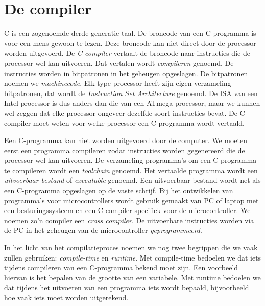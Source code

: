 \section{De compiler}
C is een zogenoemde derde-generatie-taal. De broncode van een C-programma is voor een mens gewoon te lezen. Deze broncode kan niet direct door de processor worden uitgevoerd. De \textsl{C-compiler} vertaalt de broncode naar instructies die de processor wel kan uitvoeren. Dat vertalen wordt \textsl{compileren} genoemd. De instructies worden in bitpatronen in het geheugen opgeslagen. De bitpatronen noemen we \textsl{machinecode}. Elk type processor heeft zijn eigen verzameling bitpatronen, dat wordt de \textsl{Instruction Set Architecture} genoemd. De ISA van een Intel-processor is dus anders dan die van een ATmega-processor, maar we kunnen wel zeggen dat elke processor ongeveer dezelfde soort instructies bevat. De C-compiler moet weten voor welke processor een C-programma wordt vertaald.

Een C-programma kan niet worden uitgevoerd door de computer. We moeten eerst een programma compileren zodat instructies worden gegenereerd die de processor wel kan uitvoeren. De verzameling programma's om een C-programma te compileren wordt een \textsl{toolchain} genoemd. Het vertaalde programma wordt een \textsl{uitvoerbaar bestand} of \textsl{executable} genoemd. Een uitvoerbaar bestand wordt net als een C-programma opgeslagen op de vaste schrijf. Bij het ontwikkelen van programma's voor microcontrollers wordt gebruik gemaakt van PC of laptop met een besturingssysteem en een C-compiler specifiek voor de microcontroller. We noemen zo'n compiler een \textsl{cross compiler}. De uitvoerbare instructies worden via de PC in het geheugen van de microcontroller \textsl{geprogrammeerd}.

In het licht van het compilatieproces noemen we nog twee begrippen die we vaak zullen gebruiken: \textsl{compile-time} en \textsl{runtime}. Met compile-time bedoelen we dat iets tijdens compileren van een C-programma bekend moet zijn. Een voorbeeld hiervan is het bepalen van de grootte van een variabele. Met runtime bedoelen we dat tijdens het uitvoeren van een programma iets wordt bepaald, bijvoorbeeld hoe vaak iets moet worden uitgerekend.

